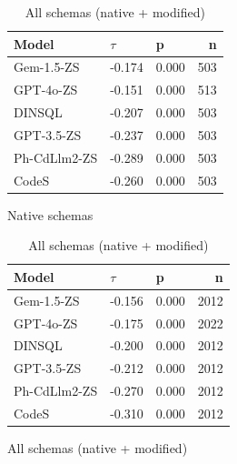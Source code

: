 \begin{table}
  \centering
  \caption{Kendall-Tau ($\tau$) Correlations between \emph{Least Identifier Proportion} and \emph{Query Recall}.}
  \begin{subfigure}{.5\linewidth}
      \centering
      \caption{Native schemas}
      \begin{tabular}{lllr}
\toprule
Model & $\tau$ & p & n \\
\midrule
Gem-1.5-ZS & -0.174 & 0.000 & 503 \\
GPT-4o-ZS & -0.151 & 0.000 & 513 \\
DINSQL & -0.207 & 0.000 & 503 \\
GPT-3.5-ZS & -0.237 & 0.000 & 503 \\
Ph-CdLlm2-ZS & -0.289 & 0.000 & 503 \\
CodeS & -0.260 & 0.000 & 503 \\
\bottomrule
\end{tabular}

      \label{table:natlow-recall-ktau-native}
  \end{subfigure}%
  \begin{subfigure}{.5\linewidth}
      \centering
      \caption{All schemas (native + modified)}
      \begin{tabular}{lllr}
\toprule
Model & $\tau$ & p & n \\
\midrule
Gem-1.5-ZS & -0.156 & 0.000 & 2012 \\
GPT-4o-ZS & -0.175 & 0.000 & 2022 \\
DINSQL & -0.200 & 0.000 & 2012 \\
GPT-3.5-ZS & -0.212 & 0.000 & 2012 \\
Ph-CdLlm2-ZS & -0.270 & 0.000 & 2012 \\
CodeS & -0.310 & 0.000 & 2012 \\
\bottomrule
\end{tabular}

      \label{table:natlow-recall-ktau-all}
  \end{subfigure}
\end{table}





